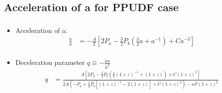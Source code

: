 \documentclass[8pt,hideothersubsections]{beamer}
\newcommand{\brac}[1]{\left(#1\right)}
\newcommand{\bracc}[1]{\left[#1\right]}
\begin{document}
{\begin{frame}
\end{frame}

\subsection{Acceleration of a for PPUDF case}
\begin{frame}
\frametitle{\insertsectionhead}
\framesubtitle{\insertsubsectionhead}
\fontsize{8pt}{7.2}\selectfont
\begin{itemize}
\item Acceleration of a:
\fontsize{6pt}{7.2}\selectfont
\begin{equation}\label{eq:RayUDF}
\begin{split}
\frac{\ddot{a}}{a} &= -\frac{A}{2}\bracc{2P_{a}-\frac{3}{2}P_{b}\brac{\frac{3}{2}a+a^{-1}}+Ca^{-3}}\\
\end{split}
\end{equation}
\fontsize{8pt}{7.2}\selectfont
\item Deceleration parameter $q\equiv-\frac{\ddot{a}a}{\dot{a}^{2}}$
\fontsize{6pt}{7.2}\selectfont
\begin{equation}\label{eq:UDFq}
\begin{split}
q &= \frac{A\bracc{2P_{a}-\frac{3}{2}P_{b}\brac{\frac{3}{2}\brac{1+z}^{-1}+\brac{1+z}}+C\brac{1+z}^{3}}}{2A\brac{-P_{a}+\frac{3}{4}P_{b}\bracc{\brac{1+z}^{-1}-2\brac{1+z}}+C\brac{1+z}^{3}} -\kappa F \brac{1+z}^{2}}       \\
\end{split}
\end{equation}
\end{itemize}


\end{frame}}
\end{document}
